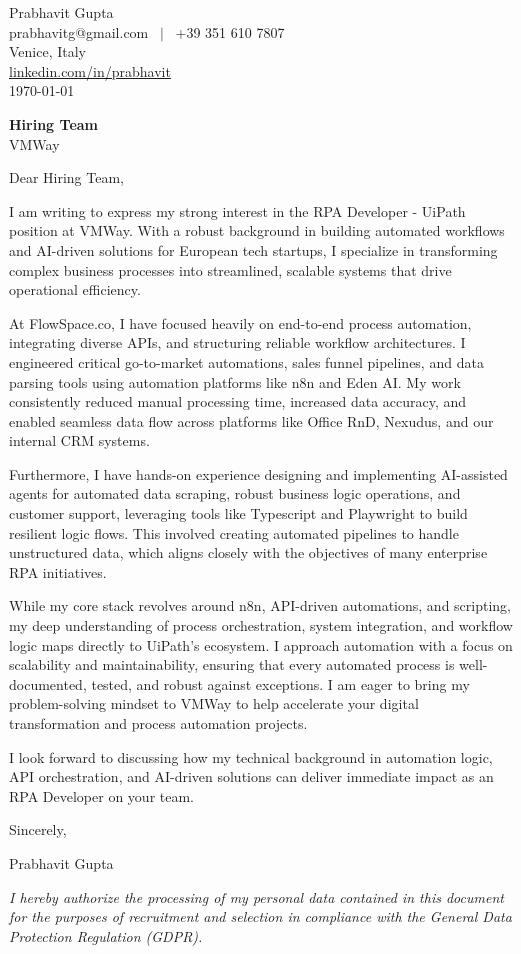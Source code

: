 \documentclass[10.5pt,a4paper]{article}
\begin{document}
Prabhavit Gupta\\
prabhavitg@gmail.com ~$\vert$~ +39 351 610 7807\\
Venice, Italy\\
\href{https://www.linkedin.com/in/prabhavit/}{linkedin.com/in/prabhavit}\\
\today

\textbf{Hiring Team}\\
VMWay

Dear Hiring Team,

I am writing to express my strong interest in the RPA Developer - UiPath position at VMWay. With a robust background in building automated workflows and AI-driven solutions for European tech startups, I specialize in transforming complex business processes into streamlined, scalable systems that drive operational efficiency.

At FlowSpace.co, I have focused heavily on end-to-end process automation, integrating diverse APIs, and structuring reliable workflow architectures. I engineered critical go-to-market automations, sales funnel pipelines, and data parsing tools using automation platforms like n8n and Eden AI. My work consistently reduced manual processing time, increased data accuracy, and enabled seamless data flow across platforms like Office RnD, Nexudus, and our internal CRM systems. 

Furthermore, I have hands-on experience designing and implementing AI-assisted agents for automated data scraping, robust business logic operations, and customer support, leveraging tools like Typescript and Playwright to build resilient logic flows. This involved creating automated pipelines to handle unstructured data, which aligns closely with the objectives of many enterprise RPA initiatives. 

While my core stack revolves around n8n, API-driven automations, and scripting, my deep understanding of process orchestration, system integration, and workflow logic maps directly to UiPath's ecosystem. I approach automation with a focus on scalability and maintainability, ensuring that every automated process is well-documented, tested, and robust against exceptions. I am eager to bring my problem-solving mindset to VMWay to help accelerate your digital transformation and process automation projects.

I look forward to discussing how my technical background in automation logic, API orchestration, and AI-driven solutions can deliver immediate impact as an RPA Developer on your team.

Sincerely,

Prabhavit Gupta

\vspace{0.8em}
{\footnotesize \textit{I hereby authorize the processing of my personal data contained in this document for the purposes of recruitment and selection in compliance with the General Data Protection Regulation (GDPR).}\par}
\end{document}

